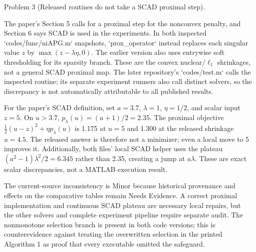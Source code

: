 \documentclass[10pt]{article}
\begin{document}
Problem 3 (Released routines do not take a SCAD proximal step).\par
The paper’s Section 5 calls for a proximal step for the nonconvex penalty, and Section 6 says SCAD is used in the experiments. In both inspected `codes/func/niAPG.m` snapshots, `prox\_operator` instead replaces each singular value \(z\) by \(\max(z-\lambda\eta,0)\). The earlier version also uses entrywise soft thresholding for its sparsity branch. These are the convex nuclear/\(\ell_1\) shrinkages, not a general SCAD proximal map. The later repository’s `codes/test.m` calls the inspected routine; its separate experiment runners also call distinct solvers, so the discrepancy is not automatically attributable to all published results.\par
For the paper’s SCAD definition, set \(a=3.7\), \(\lambda=1\), \(\eta=1/2\), and scalar input \(z=5\). On \(u>3.7\), \(p_\lambda(u)=(a+1)/2=2.35\). The proximal objective \(\tfrac12(u-z)^2+\eta p_\lambda(u)\) is 1.175 at \(u=5\) and 1.300 at the released shrinkage \(u=4.5\). The released answer is therefore not a minimizer; even a local move to 5 improves it. Additionally, both files’ local SCAD helper uses the plateau \((a^2-1)\lambda^2/2=6.345\) rather than 2.35, creating a jump at \(a\lambda\). These are exact scalar discrepancies, not a MATLAB execution result.\par
The current-source inconsistency is Minor because historical provenance and effects on the comparative tables remain Needs Evidence. A correct proximal implementation and continuous SCAD plateau are necessary local repairs, but the other solvers and complete experiment pipeline require separate audit. The nonmonotone selection branch is present in both code versions; this is counterevidence against treating the overwritten selection in the printed Algorithm 1 as proof that every executable omitted the safeguard.\par
\end{document}
